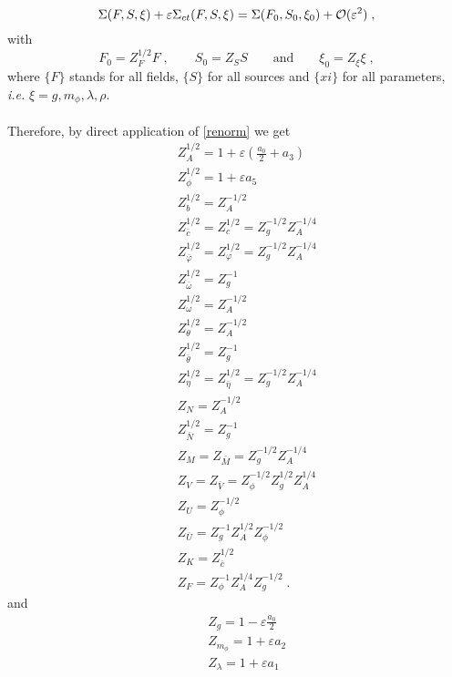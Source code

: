 \begin{appendix}
\begin{equation}
\Sigma(F,S,\xi)+\varepsilon \Sigma_{ct}(F,S,\xi) = \Sigma(F_{0},S_{0},\xi_{0}) + {\cal O}(\varepsilon^{2})\;,
\end{equation}
with
\begin{equation}
F_{0} = Z^{1/2}_{F}F\;, \qquad S_{0} = Z_{S}S \qquad \text{and} \qquad \xi_{0} = Z_{\xi}\xi\;, 
\end{equation}
where $\{F\}$ stands for all fields, $\{S\}$ for all sources and $\{xi\}$ for all parameters, {\it i.e.} $\xi=g,m_{\phi}, \lambda, \rho$. \\\\Therefore, by direct application of \eqref{renorm} we get
\begin{eqnarray}
&&
Z^{1/2}_{A} = 1+ \varepsilon\left(\frac{a_{0}}{2} + a_{3}\right) \\
&&
Z^{1/2}_{\phi}= 1 +\varepsilon a_{5}\\
&&
Z^{1/2}_{b} = Z^{-1/2}_{A} \\
&&
Z^{1/2}_{\bar{c}} =Z^{1/2}_{c} =Z^{-1/2}_{g} Z^{-1/4}_{A} \\
&&
Z^{1/2}_{\bar{\varphi}} =Z^{1/2}_{\varphi} =Z^{-1/2}_{g} Z^{-1/4}_{A}\\
&&
Z^{1/2}_{\bar{\omega}} =Z^{-1}_{g} \\
&&
Z^{1/2}_{\omega} =Z^{-1/2}_{A}\\
&&
Z^{1/2}_{\theta} = Z^{-1/2}_{A}\\
&&
Z^{1/2}_{\bar{\theta}} = Z^{-1}_{g}\\
&&
Z^{1/2}_{\eta} = Z^{1/2}_{\bar{\eta}} = Z^{-1/2}_{g}Z^{-1/4}_{A}\\
&&
Z_{N} =Z^{-1/2}_{A} \\
&&
Z^{1/2}_{\bar{N}} =Z^{-1}_{g} \\
&&
Z_{M} =Z_{\bar{M}} =Z^{-1/2}_{g}Z^{-1/4}_{A} \\
&&
Z_{V} = Z_{\bar{V}} = Z^{-1/2}_{\phi} Z^{1/2}_{g}Z^{1/4}_{A}\\
&&
Z_{U} = Z^{-1/2}_{\phi} \\
&&
Z_{\bar{U}} = Z^{-1}_{g}Z^{1/2}_{A}Z^{-1/2}_{\phi} \\
&&
Z_{K} =Z^{1/2}_{\bar{c}}\\
&&
Z_{F} = Z^{-1}_{\phi}Z^{1/4}_{A}Z^{-1/2}_{g}\;.
\end{eqnarray}
and
\begin{eqnarray}
&&
Z_{g} = 1-\varepsilon\frac{a_{0}}{2}\\
&&
Z_{m_{\phi}} = 1+\varepsilon a_{2}\\
&&
Z_{\lambda} = 1+\varepsilon a_{1}\\

\end{eqnarray}
\end{appendix}
